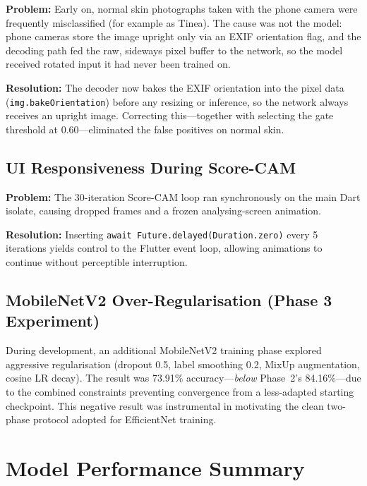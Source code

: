 \textbf{Problem:} Early on, normal skin photographs taken with the phone camera were frequently misclassified (for example as Tinea). The cause was not the model: phone cameras store the image upright only via an EXIF orientation flag, and the decoding path fed the raw, sideways pixel buffer to the network, so the model received rotated input it had never been trained on.

\textbf{Resolution:} The decoder now bakes the EXIF orientation into the pixel data (\texttt{img.bakeOrientation}) before any resizing or inference, so the network always receives an upright image. Correcting this---together with selecting the gate threshold at 0.60---eliminated the false positives on normal skin.

\subsection{UI Responsiveness During Score-CAM}

\textbf{Problem:} The 30-iteration Score-CAM loop ran synchronously on the main Dart isolate, causing dropped frames and a frozen analysing-screen animation.

\textbf{Resolution:} Inserting \texttt{await Future.delayed(Duration.zero)} every 5 iterations yields control to the Flutter event loop, allowing animations to continue without perceptible interruption.

\subsection{MobileNetV2 Over-Regularisation (Phase 3 Experiment)}

During development, an additional MobileNetV2 training phase explored aggressive regularisation (dropout 0.5, label smoothing 0.2, MixUp augmentation, cosine LR decay). The result was 73.91\% accuracy---\textit{below} Phase~2's 84.16\%---due to the combined constraints preventing convergence from a less-adapted starting checkpoint. This negative result was instrumental in motivating the clean two-phase protocol adopted for EfficientNet training.


\section{Model Performance Summary}
\label{sec:summary}

